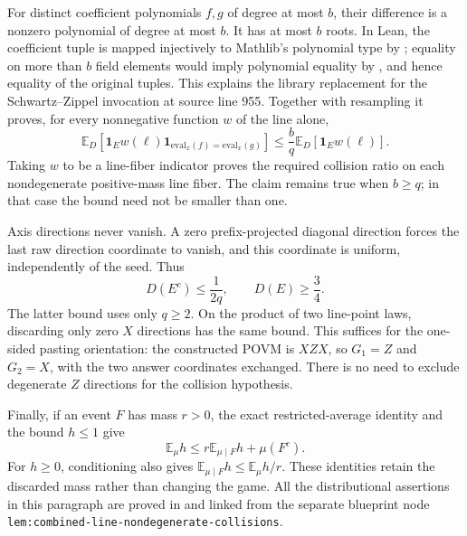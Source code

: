 \documentclass[11pt]{article}
\begin{document}
For distinct coefficient polynomials $f,g$ of degree at most $b$, their
difference is a nonzero polynomial of degree at most $b$. It has at most
$b$ roots. In Lean, the coefficient tuple is mapped injectively to Mathlib's
polynomial type by ; equality on more than $b$ field
elements would imply polynomial equality by
, and hence equality of
the original tuples. This explains the library replacement for the
Schwartz--Zippel invocation at source line 955. Together with resampling it
proves, for every nonnegative function $w$ of the line alone,
\[
 \mathbb E_D[\mathbf1_E w(\ell)
  \mathbf1_{\mathrm{eval}_x(f)=\mathrm{eval}_x(g)}]
 \le \frac bq\mathbb E_D[\mathbf1_E w(\ell)].
\]
Taking $w$ to be a line-fiber indicator proves the required collision ratio
on each nondegenerate positive-mass line fiber. The claim remains true when
$b\ge q$; in that case the bound need not be smaller than one.

Axis directions never vanish. A zero prefix-projected diagonal direction
forces the last raw direction coordinate to vanish, and this coordinate is
uniform, independently of the seed. Thus
\[
 D(E^c)\le\frac1{2q},\qquad D(E)\ge\frac34.
\]
The latter bound uses only $q\ge2$. On the product of two line-point laws,
discarding only zero $X$ directions has the same bound. This suffices for the
one-sided pasting orientation: the constructed POVM is $XZX$, so $G_1=Z$
and $G_2=X$, with the two answer coordinates exchanged. There is no need to
exclude degenerate $Z$ directions for the collision hypothesis.

Finally, if an event $F$ has mass $r>0$, the exact restricted-average identity
and the bound $h\le1$ give
\[
 \mathbb E_\mu h\le r\mathbb E_{\mu\mid F}h+\mu(F^c).
\]
For $h\ge0$, conditioning also gives
$\mathbb E_{\mu\mid F}h\le\mathbb E_\mu h/r$.
These identities retain the discarded mass rather than changing the game.
All the distributional assertions in this paragraph are proved in
 and linked from the separate
blueprint node \texttt{lem:combined-line-nondegenerate-collisions}.
\end{document}
